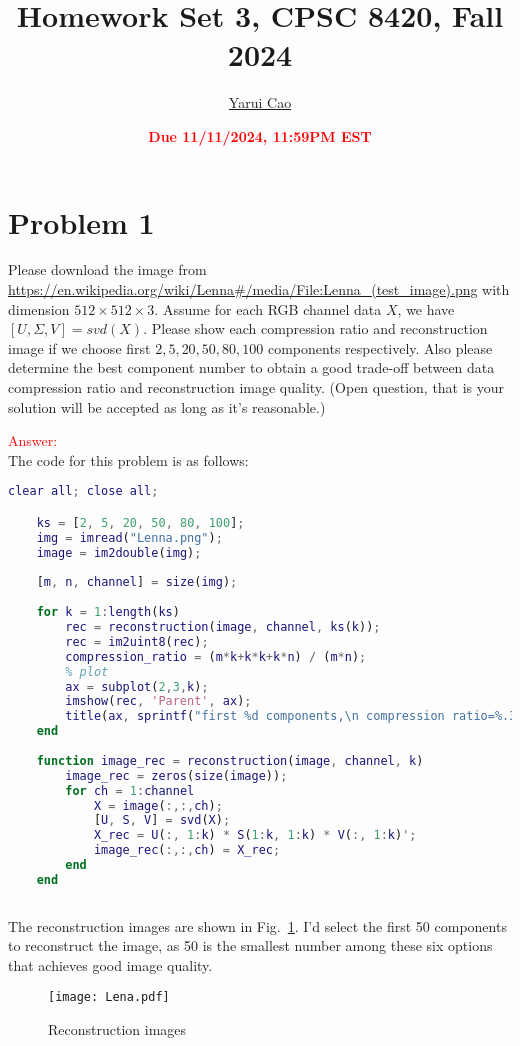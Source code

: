 \documentclass[11pt]{article}
\title{{\bf Homework Set 3, CPSC 8420, Fall 2024}} %
\author{\Large\underline{Yarui Cao}}
\date{\textbf{\Large\textcolor{red}{Due 11/11/2024, 11:59PM EST}}} %
\begin{document}
	\maketitle
	

\section*{Problem 1}
Please download the image from \url{https://en.wikipedia.org/wiki/Lenna#/media/File:Lenna_(test_image).png} with dimension $512\times512\times3$. Assume for each RGB channel data $X$, we have $[U,\Sigma,V]=svd(X)$. Please show each compression ratio and reconstruction image if we choose first $2, 5, 20, 50,80,100$ components respectively. Also please determine the best component number to obtain a good trade-off between data compression ratio and reconstruction image quality. (Open question, that is your solution will be accepted as long as it's reasonable.)

\textcolor{red}{Answer:}\\
The code for this problem is as follows:
\begin{lstlisting}[language = matlab]
	clear all; close all;

    ks = [2, 5, 20, 50, 80, 100];
    img = imread("Lenna.png");
    image = im2double(img);
    
    [m, n, channel] = size(img);
    
    for k = 1:length(ks)
        rec = reconstruction(image, channel, ks(k));
        rec = im2uint8(rec);
        compression_ratio = (m*k+k*k+k*n) / (m*n);
        % plot
        ax = subplot(2,3,k);
        imshow(rec, 'Parent', ax);
        title(ax, sprintf("first %d components,\n compression ratio=%.3f", ks(k), compression_ratio))
    end
    
    function image_rec = reconstruction(image, channel, k)
        image_rec = zeros(size(image));
        for ch = 1:channel
            X = image(:,:,ch);
            [U, S, V] = svd(X);
            X_rec = U(:, 1:k) * S(1:k, 1:k) * V(:, 1:k)';
            image_rec(:,:,ch) = X_rec;
        end
    end
    
\end{lstlisting}
The reconstruction images are shown in Fig.~\ref{fig:rec}. I'd select the first 50 components to reconstruct the image, as 50 is the smallest number among these six options that achieves good image quality.
\begin{figure}[h]
    \centering
    \texttt{[image: Lena.pdf]}
    \caption{Reconstruction images}
    \label{fig:rec}
\end{figure}
\end{document}
